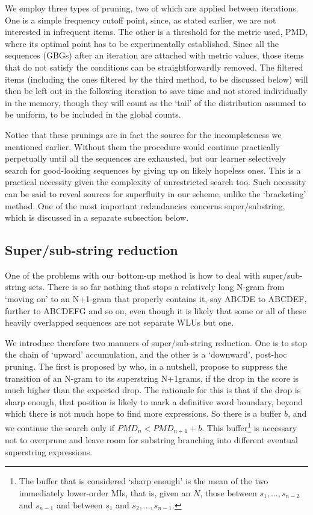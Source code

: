 \documentclass[a4]{article}
\begin{document}
We employ three types of pruning, two of which are applied between iterations. One is a simple frequency cutoff point, since, as stated earlier, we are not interested in infrequent items. The other is a threshold for the metric used, PMD, where its optimal point has to be experimentally established. Since all the sequences (GBGs) after an iteration are attached with metric values, those items that do not satisfy the conditions can be straightforwardly removed. The filtered items (including the ones filtered by the third method, to be discussed below) will then be left out in the following iteration to save time and not stored individually in the memory, though they will count as the `tail' of the distribution assumed to be uniform, to be included in the global counts.

Notice that these prunings are in fact the source for the incompleteness we mentioned earlier. Without them the procedure would continue practically perpetually until all the sequences are exhausted, but our learner selectively search for good-looking sequences by giving up on likely hopeless ones. This is a practical necessity given the complexity of unrestricted search too. Such necessity can be said to reveal sources for superfluity in our scheme, unlike the `bracketing' method. One of the most important redandancies concerns super/substring, which is discussed in a separate subsection below.

\subsection{Super/sub-string reduction}

One of the problems with our bottom-up method is how to deal with super/sub-string sets. There is so far nothing that stops a relatively long N-gram from `moving on' to an N+1-gram that properly contains it, say ABCDE to ABCDEF, further to ABCDEFG and so on, even though it is likely that some or all of these heavily overlapped sequences are not separate WLUs but one. 

We introduce therefore two manners of super/sub-string reduction. One is to stop the chain of `upward' accumulation, and the other is a `downward', post-hoc pruning. The first is proposed by \cite{DuEtAl15} who, in a nutshell, propose to suppress the transition of an N-gram to its superstring N+1grams, if the drop in the score is much higher than the expected drop. The rationale for this is that if the drop is sharp enough, that position is likely to mark a definitive word boundary, beyond which there is not much hope to find more expressions. So there is a buffer $b$, and we continue the search only if $PMD_{n}<PMD_{n+1}+b$. This buffer\footnote{The buffer that is considered `sharp enough' is the mean of the two immediately lower-order MIs, that is, given an $N$, those between $s_1,...,s_{n-2}$ and $s_{n-1}$ and between $s_1$ and $s_2,...,s_{n-1}$.} is necessary not to overprune and leave room for substring branching into different eventual superstring expressions.
\end{document}
